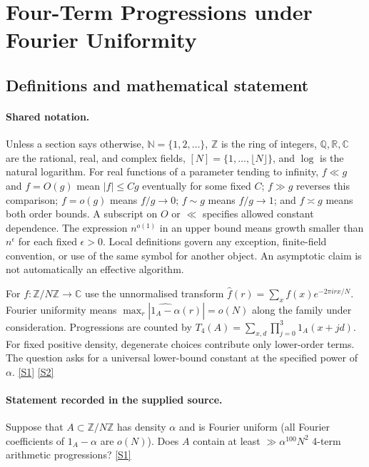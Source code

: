 \documentclass[11pt,a4paper]{article}
\newcommand{\N}{\mathbb{N}}
\newcommand{\Z}{\mathbb{Z}}
\newcommand{\Q}{\mathbb{Q}}
\newcommand{\R}{\mathbb{R}}
\newcommand{\C}{\mathbb{C}}
\newcommand{\sref}[2]{\hyperlink{source:#1:#2}{[S#2]}}
\begin{document}
\section{Four-Term Progressions under Fourier Uniformity}\label{statement}


\subsection{Definitions and mathematical statement}

\paragraph{Shared notation.}Unless a section says otherwise, $\N=\{1,2,\ldots\}$,
$\Z$ is the ring of integers, $\Q,\R,\C$ are the rational, real, and complex
fields, $[N]=\{1,\ldots,\lfloor N\rfloor\}$, and $\log$ is the natural
logarithm. For real functions of a parameter tending to infinity,
$f\ll g$ and $f=O(g)$ mean $|f|\leq Cg$ eventually for some fixed $C$;
$f\gg g$ reverses this comparison; $f=o(g)$ means $f/g\to0$;
$f\sim g$ means $f/g\to1$; and $f\asymp g$ means both order bounds.
A subscript on $O$ or $\ll$ specifies allowed constant dependence.
The expression $n^{o(1)}$ in an upper bound means growth smaller than
$n^\epsilon$ for each fixed $\epsilon>0$. Local definitions govern any
exception, finite-field convention, or use of the same symbol for another
object. An asymptotic claim is not automatically an effective algorithm.



For $f:\Z/N\Z\to\C$ use the unnormalised transform $\widehat f(r)=\sum_x f(x)e^{-2\pi i rx/N}$. Fourier uniformity means $\max_r|\widehat{1_A-\alpha}(r)|=o(N)$ along the family under consideration. Progressions are counted by $T_4(A)=\sum_{x,d}\prod_{j=0}^3 1_A(x+jd)$. For fixed positive density, degenerate choices contribute only lower-order terms. The question asks for a universal lower-bound constant at the specified power of $\alpha$. \sref{statement}{1} \sref{statement}{2}

\paragraph{Statement recorded in the supplied source.}
Suppose that $A \subset \mathbb{Z}/N\mathbb{Z}$ has density $\alpha$ and is Fourier uniform (all Fourier coefficients of $1_A - \alpha$ are $o(N)$). Does $A$ contain at least $\gg \alpha^{100}N^2$ 4-term arithmetic progressions? \sref{statement}{1}
\end{document}
